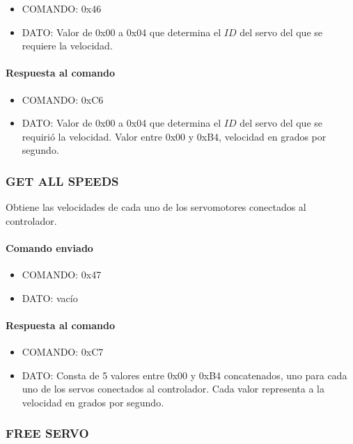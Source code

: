 \begin{itemize}
	\item{COMANDO:} 0x46
	\item{DATO:} Valor de 0x00 a 0x04 que determina el $ID$ del servo del que se requiere la velocidad.
\end{itemize}

\paragraph*{Respuesta al comando}

\begin{itemize}
	\item{COMANDO:} 0xC6
	\item{DATO:} Valor de 0x00 a 0x04 que determina el $ID$ del servo del que se requiri\'o la velocidad.
	Valor entre 0x00 y 0xB4, velocidad en grados por segundo.
\end{itemize}

\subsubsection{GET ALL SPEEDS}
\label{hA_protocolo_get_all_speeds}

Obtiene las velocidades de cada uno de los servomotores conectados al controlador.

\paragraph*{Comando enviado}

\begin{itemize}
	\item{COMANDO:} 0x47
	\item{DATO:} vac\'io
\end{itemize}

\paragraph*{Respuesta al comando}

\begin{itemize}
	\item{COMANDO:} 0xC7
	\item{DATO:} Consta de 5 valores entre 0x00 y 0xB4 concatenados, uno para cada uno de los servos conectados al controlador.
	Cada valor representa a la velocidad en grados por segundo.
\end{itemize}

\subsubsection{FREE SERVO}
\label{hA_protocolo_free_servo}

